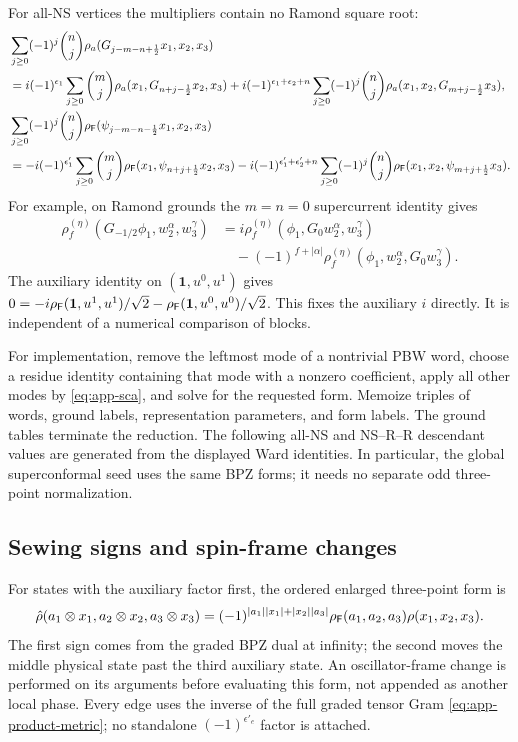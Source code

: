 For all-NS vertices the multipliers contain no Ramond square root:
\begin{align}
 &\sum_{j\ge0}(-1)^j\binom nj
       \rho_a(G_{j-m-n+\frac12}x_1,x_2,x_3)\nonumber\\
 &=i(-1)^{\epsilon_1}\sum_{j\ge0}\binom mj
       \rho_a(x_1,G_{n+j-\frac12}x_2,x_3)
   +i(-1)^{\epsilon_1+\epsilon_2+n}
      \sum_{j\ge0}(-1)^j\binom nj
                      \rho_a(x_1,x_2,G_{m+j-\frac12}x_3),
 \label{eq:app-ns-g-ward}\\
 &\sum_{j\ge0}(-1)^j\binom nj
       \rho_{\mathsf F}(\psi_{j-m-n-\frac12}x_1,x_2,x_3)\nonumber\\
 &=-i(-1)^{\epsilon'_1}\sum_{j\ge0}\binom mj
       \rho_{\mathsf F}(x_1,\psi_{n+j+\frac12}x_2,x_3)
   -i(-1)^{\epsilon'_1+\epsilon'_2+n}
      \sum_{j\ge0}(-1)^j\binom nj
                      \rho_{\mathsf F}(x_1,x_2,\psi_{m+j+\frac12}x_3).
 \label{eq:app-ns-psi-ward}
\end{align}
For example, on Ramond grounds the $m=n=0$ supercurrent identity gives
\begin{align}
 \rho_f^{(\eta)}(G_{-1/2}\phi_1,w_2^\alpha,w_3^\gamma)
 &=i\rho_f^{(\eta)}(\phi_1,G_0w_2^\alpha,w_3^\gamma)\nonumber\\
 &\quad-(-1)^{f+|\alpha|}
       \rho_f^{(\eta)}(\phi_1,w_2^\alpha,G_0w_3^\gamma).
 \label{eq:app-ground-g-ward}
\end{align}
The auxiliary identity on $(\mathbf1,u^0,u^1)$ gives
$0=-i\rho_{\mathsf F}(\mathbf1,u^1,u^1)/\sqrt2
       -\rho_{\mathsf F}(\mathbf1,u^0,u^0)/\sqrt2$.
This fixes the auxiliary $i$ directly. It is independent of a numerical
comparison of blocks.

For implementation, remove the leftmost mode of a nontrivial PBW word,
choose a residue identity containing that mode with a nonzero coefficient,
apply all other modes by \eqref{eq:app-sca}, and solve for the requested
form. Memoize triples of words, ground labels, representation parameters,
and form labels. The ground tables terminate the reduction. The following
all-NS and NS--R--R descendant values are generated from the
displayed Ward identities. In particular, the global
superconformal seed uses the same BPZ forms; it needs no separate
odd three-point normalization.

\subsection{Sewing signs and spin-frame changes}
\label{app:sewing}

For states with the auxiliary factor first, the ordered enlarged
three-point form is
\begin{equation}
 \hat\rho(a_1\otimes x_1,a_2\otimes x_2,a_3\otimes x_3)
 =(-1)^{|a_1||x_1|+|x_2||a_3|}
   \rho_{\mathsf F}(a_1,a_2,a_3)\rho(x_1,x_2,x_3).
 \label{eq:app-enlarged-vertex}
\end{equation}
The first sign comes from the graded BPZ dual at infinity; the
second moves the middle physical state past the third auxiliary
state. An oscillator-frame change is performed on its arguments
before evaluating this form, not appended as another local phase.
Every edge uses the inverse of the full graded tensor Gram
\eqref{eq:app-product-metric}; no standalone
$(-1)^{\epsilon'_e}$ factor is attached.

